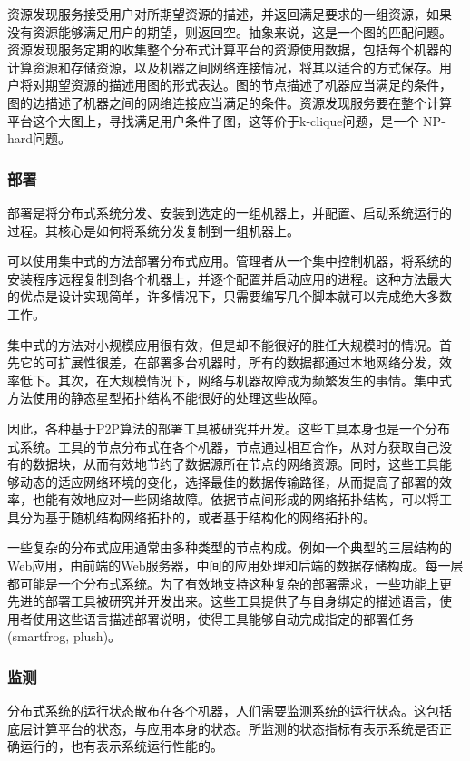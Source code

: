 资源发现服务接受用户对所期望资源的描述，并返回满足要求的一组资源，如果
没有资源能够满足用户的期望，则返回空。抽象来说，这是一个图的匹配问题。
资源发现服务定期的收集整个分布式计算平台的资源使用数据，包括每个机器的
计算资源和存储资源，以及机器之间网络连接情况，将其以适合的方式保存。用
户将对期望资源的描述用图的形式表达。图的节点描述了机器应当满足的条件，
图的边描述了机器之间的网络连接应当满足的条件。资源发现服务要在整个计算
平台这个大图上，寻找满足用户条件子图，这等价于k-clique问题，是一个
NP-hard问题。

\subsubsection*{部署}

部署是将分布式系统分发、安装到选定的一组机器上，并配置、启动系统运行的
过程。其核心是如何将系统分发复制到一组机器上。

可以使用集中式的方法部署分布式应用。管理者从一个集中控制机器，将系统的
安装程序远程复制到各个机器上，并逐个配置并启动应用的进程。这种方法最大
的优点是设计实现简单，许多情况下，只需要编写几个脚本就可以完成绝大多数
工作。

集中式的方法对小规模应用很有效，但是却不能很好的胜任大规模时的情况。首
先它的可扩展性很差，在部署多台机器时，所有的数据都通过本地网络分发，效
率低下。其次，在大规模情况下，网络与机器故障成为频繁发生的事情。集中式
方法使用的静态星型拓扑结构不能很好的处理这些故障。

因此，各种基于P2P算法的部署工具被研究并开发。这些工具本身也是一个分布
式系统。工具的节点分布式在各个机器，节点通过相互合作，从对方获取自己没
有的数据块，从而有效地节约了数据源所在节点的网络资源。同时，这些工具能
够动态的适应网络环境的变化，选择最佳的数据传输路径，从而提高了部署的效
率，也能有效地应对一些网络故障。依据节点间形成的网络拓扑结构，可以将工
具分为基于随机结构网络拓扑的，或者基于结构化的网络拓扑的。

一些复杂的分布式应用通常由多种类型的节点构成。例如一个典型的三层结构的
Web应用，由前端的Web服务器，中间的应用处理和后端的数据存储构成。每一层
都可能是一个分布式系统。为了有效地支持这种复杂的部署需求，一些功能上更
先进的部署工具被研究并开发出来。这些工具提供了与自身绑定的描述语言，使
用者使用这些语言描述部署说明，使得工具能够自动完成指定的部署任务
(smartfrog, plush)。

\subsubsection*{监测}

分布式系统的运行状态散布在各个机器，人们需要监测系统的运行状态。这包括
底层计算平台的状态，与应用本身的状态。所监测的状态指标有表示系统是否正
确运行的，也有表示系统运行性能的。

